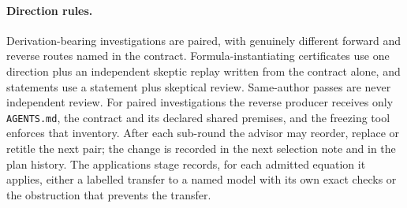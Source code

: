 \paragraph{Direction rules.}
Derivation-bearing investigations are paired, with genuinely different
forward and reverse routes named in the contract. Formula-instantiating
certificates use one direction plus an independent skeptic replay written
from the contract alone, and statements use a statement plus skeptical
review. Same-author passes are never independent review. For paired
investigations the reverse producer receives only \texttt{AGENTS.md}, the
contract and its declared shared premises, and the freezing tool enforces that
inventory. After each sub-round the advisor may reorder, replace or retitle
the next pair; the change is recorded in the next selection note and in the
plan history. The applications stage records, for each admitted equation it
applies, either a labelled transfer to a named model with its own exact
checks or the obstruction that prevents the transfer.

